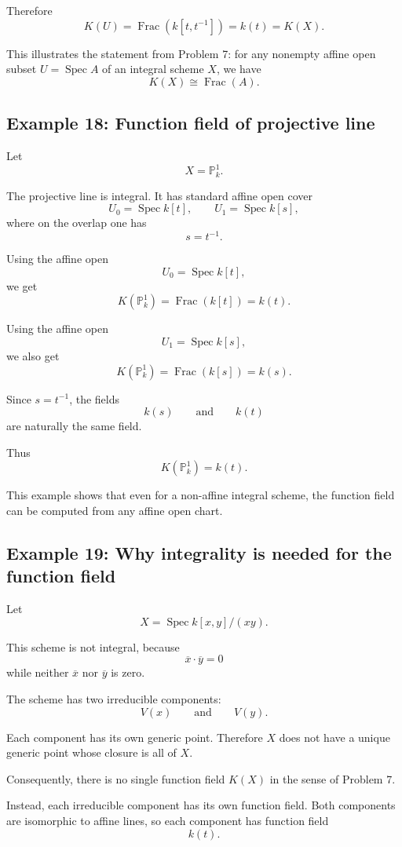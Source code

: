 \documentclass[12pt,a4paper]{article}
\theoremstyle{notespace}
\begin{document}
Therefore
\[
K(U)=\operatorname{Frac}(k[t,t^{-1}])=k(t)=K(X).
\]

This illustrates the statement from Problem 7: for any nonempty affine open subset \(U=\operatorname{Spec} A\) of an integral scheme \(X\), we have
\[
K(X)\cong \operatorname{Frac}(A).
\]

\subsection{Example 18: Function field of projective line}

Let
\[
X=\mathbb P_k^1.
\]

The projective line is integral. It has standard affine open cover
\[
U_0=\operatorname{Spec} k[t],
\qquad
U_1=\operatorname{Spec} k[s],
\]
where on the overlap one has
\[
s=t^{-1}.
\]

Using the affine open
\[
U_0=\operatorname{Spec} k[t],
\]
we get
\[
K(\mathbb P_k^1)=\operatorname{Frac}(k[t])=k(t).
\]

Using the affine open
\[
U_1=\operatorname{Spec} k[s],
\]
we also get
\[
K(\mathbb P_k^1)=\operatorname{Frac}(k[s])=k(s).
\]

Since \(s=t^{-1}\), the fields
\[
k(s)
\qquad\text{and}\qquad
k(t)
\]
are naturally the same field.

Thus
\[
K(\mathbb P_k^1)=k(t).
\]

This example shows that even for a non-affine integral scheme, the function field can be computed from any affine open chart.

\subsection{Example 19: Why integrality is needed for the function field}

Let
\[
X=\operatorname{Spec} k[x,y]/(xy).
\]

This scheme is not integral, because
\[
\overline{x}\cdot \overline{y}=0
\]
while neither \(\overline{x}\) nor \(\overline{y}\) is zero.

The scheme has two irreducible components:
\[
V(x)
\qquad\text{and}\qquad
V(y).
\]

Each component has its own generic point. Therefore \(X\) does not have a unique generic point whose closure is all of \(X\).

Consequently, there is no single function field \(K(X)\) in the sense of Problem 7.

Instead, each irreducible component has its own function field. Both components are isomorphic to affine lines, so each component has function field
\[
k(t).
\]
\end{document}
